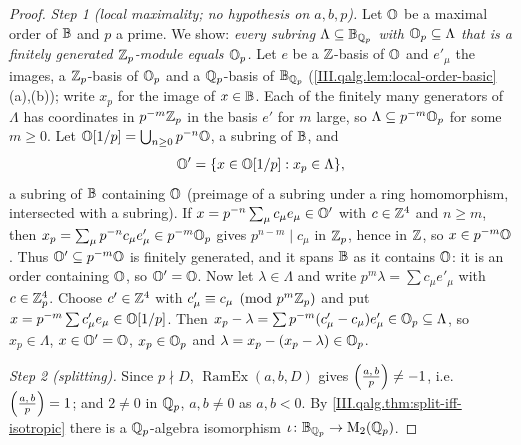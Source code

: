 \begin{theorem}
\end{theorem}
\begin{proof}
\emph{Step 1 (local maximality; no hypothesis on $a,b,p$).} Let $\mathbb{O}$ be a maximal order of $\mathbb{B}$ and $p$ a prime. We show: \emph{every subring
$\Lambda\subseteq\mathbb{B}_{\mathbb{Q}_p}$ with $\mathbb{O}_p\subseteq\Lambda$ that is a finitely generated $\mathbb{Z}_p$-module equals $\mathbb{O}_p$.} Let $e$ be a $\mathbb{Z}$-basis of $\mathbb{O}$ and
$e'_\mu$ the images, a $\mathbb{Z}_p$-basis of $\mathbb{O}_p$ and a $\mathbb{Q}_p$-basis of $\mathbb{B}_{\mathbb{Q}_p}$ (\cref{III.qalg.lem:local-order-basic}(a),(b)); write $x_p$ for the image of
$x\in\mathbb{B}$. Each of the finitely many generators of $\Lambda$ has coordinates in $p^{-m}\mathbb{Z}_p$ in the basis $e'$ for $m$ large, so $\Lambda\subseteq p^{-m}\mathbb{O}_p$
for some $m\ge0$. Let $\mathbb{O}[1/p]=\bigcup_{n\ge0}p^{-n}\mathbb{O}$, a subring of $\mathbb{B}$, and
\[
  \mathbb{O}'=\{x\in\mathbb{O}[1/p]:x_p\in\Lambda\},
\]
a subring of $\mathbb{B}$ containing $\mathbb{O}$ (preimage of a subring under a ring homomorphism, intersected with a subring). If $x=p^{-n}\sum_\mu c_\mu e_\mu\in\mathbb{O}'$
with $c\in\mathbb{Z}^4$ and $n\ge m$, then $x_p=\sum_\mu p^{-n}c_\mu e'_\mu\in p^{-m}\mathbb{O}_p$ gives $p^{n-m}\mid c_\mu$ in $\mathbb{Z}_p$, hence in $\mathbb{Z}$, so $x\in p^{-m}\mathbb{O}$.
Thus $\mathbb{O}'\subseteq p^{-m}\mathbb{O}$ is finitely generated, and it spans $\mathbb{B}$ as it contains $\mathbb{O}$: it is an order containing $\mathbb{O}$, so $\mathbb{O}'=\mathbb{O}$.
Now let $\lambda\in\Lambda$ and write $p^m\lambda=\sum c_\mu e'_\mu$ with $c\in\mathbb{Z}_p^4$. Choose $c'\in\mathbb{Z}^4$ with $c'_\mu\equiv c_\mu\pmod{p^m\mathbb{Z}_p}$ and
put $x=p^{-m}\sum c'_\mu e_\mu\in\mathbb{O}[1/p]$. Then $x_p-\lambda=\sum p^{-m}(c'_\mu-c_\mu)e'_\mu\in\mathbb{O}_p\subseteq\Lambda$, so $x_p\in\Lambda$, $x\in\mathbb{O}'=\mathbb{O}$,
$x_p\in\mathbb{O}_p$ and $\lambda=x_p-(x_p-\lambda)\in\mathbb{O}_p$.

\emph{Step 2 (splitting).} Since $p\nmid D$, $\operatorname{RamEx}(a,b,D)$ gives $\Bigl(\tfrac{a,\,b}{p}\Bigr)\ne-1$, i.e.\ $\Bigl(\tfrac{a,\,b}{p}\Bigr)=1$; and $2\ne0$ in $\mathbb{Q}_p$, $a,b\ne0$ as
$a,b<0$. By \cref{III.qalg.thm:split-iff-isotropic} there is a $\mathbb{Q}_p$-algebra isomorphism $\iota\colon\mathbb{B}_{\mathbb{Q}_p}\to\mathrm{M}_2(\mathbb{Q}_p)$.


\end{proof}
